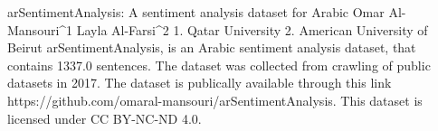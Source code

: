 
arSentimentAnalysis: A sentiment analysis dataset for Arabic
Omar Al-Mansouri^1 Layla Al-Farsi^2
1. Qatar University 2. American University of Beirut
arSentimentAnalysis, is an Arabic sentiment analysis dataset, that contains 1337.0 sentences.
The dataset was collected from crawling of public datasets in 2017. 
The dataset is publically available through this link https://github.com/omaral-mansouri/arSentimentAnalysis. This dataset is licensed under CC BY-NC-ND 4.0.

